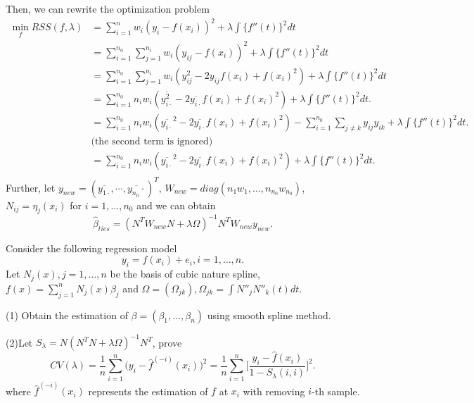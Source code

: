 \begin{solution}
    Then, we can rewrite the optimization problem
    \begin{equation*}
        \begin{split}
            \min_f RSS(f,\lambda) 
            & = \sum_{i=1}^n w_i (y_i - f(x_i))^2 + \lambda \int \{f''(t)\}^2dt \\
            & = \sum_{i=1}^{n_0} \sum_{j=1}^{n_i} w_i (y_{ij} - f(x_i))^2 + \lambda \int \{f''(t)\}^2dt \\
            & = \sum_{i=1}^{n_0} \sum_{j=1}^{n_i} w_i (y_{ij}^2 - 2 y_{ij} f(x_i) + f(x_i)^2) + \lambda \int \{f''(t)\}^2dt \\
            & = \sum_{i=1}^{n_0} n_i w_i \left( \overline{y_{i\cdot}^2} - 2 \overline{y_{i\cdot}} f(x_i) + f(x_i)^2 \right) + \lambda \int \{f''(t)\}^2dt . \\
            & = \sum_{i=1}^{n_0} n_i w_i \left( \overline{y_{i\cdot}}^2 - 2 \overline{y_{i\cdot}} f(x_i) + f(x_i)^2 \right) - \sum_{i=1}^{n_0} \sum_{j\neq k} y_{ij} y_{ik} + \lambda \int \{f''(t)\}^2dt . \\
            & \text{(the second term is ignored)} \\
            & = \sum_{i=1}^{n_0} n_i w_i \left( \overline{y_{i\cdot}}^2 - 2 \overline{y_{i\cdot}} f(x_i) + f(x_i)^2 \right) + \lambda \int \{f''(t)\}^2dt . \\
        \end{split}
    \end{equation*}
    Further, let $y_{new} = \left(\overline{y_{1\cdot}}, \cdots, \overline{y_{n_0}\cdot} \right)^T$, $W_{new}=diag(n_1 w_1, \dots, n_{n_0} w_{n_0})$, $N_{ij} = \eta_j (x_i)$ for $i=1,\dots, n_0$ and we can obtain
    \begin{equation*}
        \hat{\beta}_{ties} = (N^T W_{new} N + \lambda \Omega )^{-1} N^T  W_{new} y_{new}.
    \end{equation*}
\end{solution}




\begin{problem}[16.1]
    Consider the following regression model
    \begin{equation*}
        y_i=f(x_i)+e_i,i=1,\ldots,n.
    \end{equation*}
    Let $N_j(x), j=1,\ldots,n$ be the basis of cubic nature spline, $f(x)=\sum_{j=1}^nN_j(x)\beta_j$ and $\Omega=(\Omega_{jk}), \Omega_{jk}=\int N''_jN''_k(t)dt$.
    
    (1) Obtain the estimation of $\beta = (\beta_1, \dots, \beta_n )$ using smooth spline method.
    
    (2)Let $S_\lambda=N(N^TN+\lambda\Omega)^{-1}N^T$, prove
    \begin{equation*}
        CV(\lambda)=\frac1n\sum_{i=1}^n\Big(y_i-\hat{f}^{(-i)}(x_i)\Big)^2 = \frac1n\sum_{i=1}^n\Big[\frac{y_i-\hat{f}(x_i)}{1-S_\lambda(i,i)}\Big]^2.
    \end{equation*}
    where $\hat{f}^{(-i)}(x_i)$ represents the estimation of $f$ at $x_i$ with removing $i$-th sample.
\end{problem}

